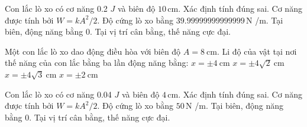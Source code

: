 \begin{ex}
Con lắc lò xo có cơ năng 0.2 $J$ và biên độ $10\,\text{cm}$. Xác định tính đúng sai.
\choiceTF
{\True Cơ năng được tính bởi $W=kA^2/2$.}
{\True Độ cứng lò xo bằng $39.99999999999999\,\text{N}$ /m.}
{\True Tại biên, động năng bằng 0.}
{Tại vị trí cân bằng, thế năng cực đại.}
\end{ex}

\begin{ex}
Một con lắc lò xo dao động điều hòa với biên độ $A = 8\ \mathrm{cm}$. Li độ của vật tại nơi thế năng của con lắc bằng ba lần động năng bằng:
\choice
{$x = \pm 4\ \mathrm{cm}$}
{$x = \pm 4\sqrt{2}\ \mathrm{cm}$}
{\True $x = \pm 4\sqrt{3}\ \mathrm{cm}$}
{$x = \pm 2\ \mathrm{cm}$}
\end{ex}

\begin{ex}
Con lắc lò xo có cơ năng 0.04 $J$ và biên độ $4\,\text{cm}$. Xác định tính đúng sai.
\choiceTF
{\True Cơ năng được tính bởi $W=kA^2/2$.}
{\True Độ cứng lò xo bằng $50\,\text{N}$ /m.}
{\True Tại biên, động năng bằng 0.}
{Tại vị trí cân bằng, thế năng cực đại.}
\end{ex}

